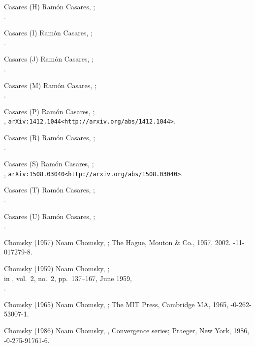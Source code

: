 \biblabel Casares (H)
Ramón Casares,
;\\
.

\biblabel Casares (I)
Ramón Casares, ;\\
.

\biblabel Casares (J)
Ramón Casares,
;\\
.

\biblabel Casares (M)
Ramón Casares,
;\\
.

\biblabel Casares (P)
Ramón Casares,
;\\
,
{\tt\URL arXiv:1412.1044<http://arxiv.org/abs/1412.1044>}.

\biblabel Casares (R)
Ramón Casares,
;\\
.

\biblabel Casares (S)
Ramón Casares,
;\\
,
{\tt\URL arXiv:1508.03040<http://arxiv.org/abs/1508.03040>}.

\biblabel Casares (T)
Ramón Casares,
;\\
.

\biblabel Casares (U)
Ramón Casares,
;\\
.

\biblabel Chomsky (1957)
Noam Chomsky,
;
The Hague, Mouton \& Co., 1957, 2002.
-11-017279-8.

\biblabel Chomsky (1959)
Noam Chomsky,
;\\
in ,
vol.\ 2, no.\ 2, pp.\ 137--167, June 1959,\\
.

\biblabel Chomsky (1965)
Noam Chomsky,
;
The MIT Press, Cambridge MA, 1965,
-0-262-53007-1.

\biblabel Chomsky (1986)
Noam Chomsky,
,
Convergence series;
Praeger, New York, 1986,
-0-275-91761-6.


